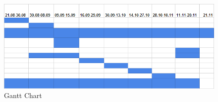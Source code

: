 \begin{figure}[H]
\includegraphics[width=1\textwidth]{images/gantt02.png}
\caption{Gantt Chart}
\end{figure}
